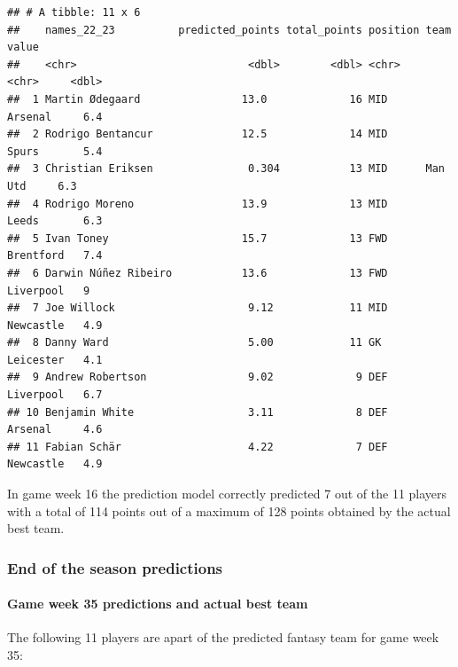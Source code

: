 \documentclass[11pt,preprint, authoryear]{elsarticle}
\numberwithin{equation}{section}
\numberwithin{figure}{section}
\numberwithin{table}{section}
\begin{document}
\begin{verbatim}
## # A tibble: 11 x 6
##    names_22_23          predicted_points total_points position team      value
##    <chr>                           <dbl>        <dbl> <chr>    <chr>     <dbl>
##  1 Martin Ødegaard                13.0             16 MID      Arsenal     6.4
##  2 Rodrigo Bentancur              12.5             14 MID      Spurs       5.4
##  3 Christian Eriksen               0.304           13 MID      Man Utd     6.3
##  4 Rodrigo Moreno                 13.9             13 MID      Leeds       6.3
##  5 Ivan Toney                     15.7             13 FWD      Brentford   7.4
##  6 Darwin Núñez Ribeiro           13.6             13 FWD      Liverpool   9  
##  7 Joe Willock                     9.12            11 MID      Newcastle   4.9
##  8 Danny Ward                      5.00            11 GK       Leicester   4.1
##  9 Andrew Robertson                9.02             9 DEF      Liverpool   6.7
## 10 Benjamin White                  3.11             8 DEF      Arsenal     4.6
## 11 Fabian Schär                    4.22             7 DEF      Newcastle   4.9
\end{verbatim}

In game week 16 the prediction model correctly predicted 7 out of the 11
players with a total of 114 points out of a maximum of 128 points
obtained by the actual best team.

\hypertarget{end-of-the-season-predictions}{%
\subsubsection{End of the season
predictions}\label{end-of-the-season-predictions}}

\hypertarget{game-week-35-predictions-and-actual-best-team}{%
\paragraph{Game week 35 predictions and actual best
team}\label{game-week-35-predictions-and-actual-best-team}}

The following 11 players are apart of the predicted fantasy team for
game week 35:
\end{document}
